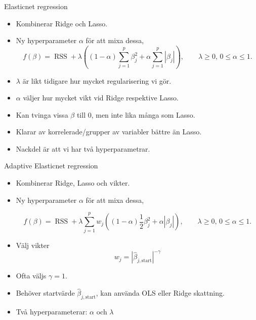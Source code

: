 \documentclass[10pt,english]{beamer}
\begin{document}
\begin{frame}{Elasticnet regression}

    \begin{itemize}
        \item Kombinerar Ridge och Lasso.
        \item Ny hyperparameter $\alpha$ för att mixa dessa,
        \begin{equation*}
            f(\beta) = \operatorname{RSS} + \lambda \left((1-\alpha) \sum_{j=1}^{p}\beta_j^2 + \alpha \sum_{j=1}^{p}|\beta_j|  \right), \qquad \lambda \geq 0,\, 0 \leq \alpha \leq 1.
        \end{equation*}
        \item $\lambda$ är likt tidigare hur mycket regularisering vi gör.
        \item $\alpha$ väljer hur mycket vikt vid Ridge respektive Lasso.
        \item Kan tvinga vissa $\beta$ till 0, men inte lika många som Lasso.
        \item Klarar av korrelerade/grupper av variabler bättre än Lasso.
        \item Nackdel är att vi har två hyperparametrar.
    \end{itemize}
    
\end{frame}


\begin{frame}{Adaptive Elasticnet regression}

    \begin{itemize}
        \item Kombinerar Ridge, Lasso och vikter.
        \item Ny hyperparameter $\alpha$ för att mixa dessa,
        
        
        \begin{equation*}
            f(\beta) = \operatorname{RSS} + \lambda \sum_{j=1}^{p} w_j \left((1-\alpha) \frac{1}{2} \beta_j^2 + \alpha|\beta_j|  \right), \qquad \lambda \geq 0,\, 0 \leq \alpha \leq 1.
        \end{equation*}
        \item Välj vikter
        \begin{equation*}
            w_j = | \hat{\beta}_{j, \text{start}} |^{-\gamma}
        \end{equation*}
        \item Ofta väljs $\gamma = 1$.
        \item Behöver startvärde $\hat{\beta}_{j,\text{start}}$, kan använda OLS eller Ridge skattning.
        \item Två hyperparameterar: $\alpha$ och $\lambda$
    \end{itemize}
    
\end{frame}
\end{document}
